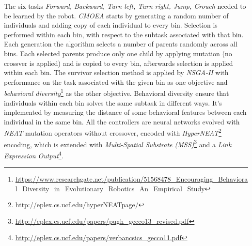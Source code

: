 \documentclass[format=acmsmall, review=false, screen=true]{acmart}
\begin{document}
The six tasks \emph{Forward, Backward, Turn-left, Turn-right, Jump, Crouch} needed to be learned by the robot. \emph{CMOEA} starts by generating a random number of individuals and adding copy of each individual to every bin. Selection is performed within each bin, with respect to the subtask associated with that bin. Each generation the algorithm selects a number of parents randomly across all bins. Each selected parents produce only one child by applying mutation (no crossver is applied) and is copied to every bin, afterwards selection is applied within each bin. The survivor selection method is applied by \emph{NSGA-II} with performance on the task associated with the given bin as one objective and \emph{behavioral diversity}\footnote{\url{https://www.researchgate.net/publication/51568478_Encouraging_Behavioral_Diversity_in_Evolutionary_Robotics_An_Empirical_Study}} as the other objective. Behavioral diversity ensure that individuals within each bin solves the same subtask in different ways. It's implemented by measuring the distance of some behavioral features between each individual in the same bin. All the controllers are neural networks evolved with \emph{NEAT} mutation operators without crossover, encoded with \emph{HyperNEAT}\footnote{\url{http://eplex.cs.ucf.edu/hyperNEATpage/}} encoding, which is extended with \emph{Multi-Spatial Substrate (MSS)}\footnote{\url{http://eplex.cs.ucf.edu/papers/pugh_gecco13_revised.pdf}} and a \emph{Link Expression Output}\footnote{\url{http://eplex.cs.ucf.edu/papers/verbancsics_gecco11.pdf}}.
\end{document}
